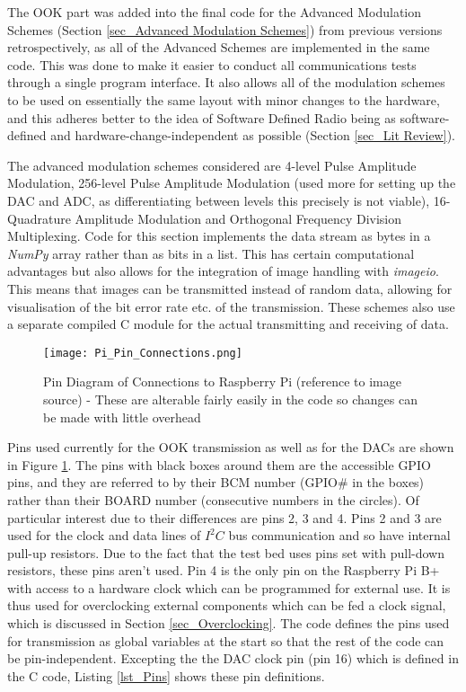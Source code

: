 \documentclass[../main.tex]{subfiles}
\begin{document}
The OOK part was added into the final code for the Advanced Modulation Schemes (Section \ref{sec_Advanced Modulation Schemes})  from previous versions retrospectively, as all of the Advanced Schemes are implemented in the same code.
This was done to make it easier to conduct all communications tests through a single program interface.
It also allows all of the modulation schemes to be used on essentially the same layout with minor changes to the hardware, and this adheres better to the idea of Software Defined Radio being as software-defined and hardware-change-independent as possible (Section \ref{sec_Lit Review}).\\

The advanced modulation schemes considered are 4-level Pulse Amplitude Modulation, 256-level Pulse Amplitude Modulation (used more for setting up the DAC and ADC, as differentiating between levels this precisely is not viable), 16-Quadrature Amplitude Modulation and Orthogonal Frequency Division Multiplexing.
Code for this section implements the data stream as bytes in a \textit{NumPy} array rather than as bits in a list.
This has certain computational advantages but also allows for the integration of image handling with \textit{imageio}.
This means that images can be transmitted instead of random data, allowing for visualisation of the bit error rate etc. of the transmission.
These schemes also use a separate compiled C module for the actual transmitting and receiving of data.\\

\begin{figure}[ht]
	\centering
	\texttt{[image: Pi\_Pin\_Connections.png]}
	\caption{Pin Diagram of Connections to Raspberry Pi (reference to image source) - These are alterable fairly easily in the code so changes can be made with little overhead}
	\label{fig_Pin Connections}
\end{figure}

Pins used currently for the OOK transmission as well as for the DACs are shown in Figure \ref{fig_Pin Connections}.
The pins with black boxes around them are the accessible GPIO pins, and they are referred to by their BCM number (GPIO\# in the boxes) rather than their BOARD number (consecutive numbers in the circles).
Of particular interest due to their differences are pins 2, 3 and 4.
Pins 2 and 3 are used for the clock and data lines of $I^2C$ bus communication and so have internal pull-up resistors.
Due to the fact that the test bed uses pins set with pull-down resistors, these pins aren't used.
Pin 4 is the only pin on the Raspberry Pi B+ with access to a hardware clock which can be programmed for external use.
It is thus used for overclocking external components which can be fed a clock signal, which is discussed in Section \ref{sec_Overclocking}.
The code defines the pins used for transmission as global variables at the start so that the rest of the code can be pin-independent.
Excepting the the DAC clock pin (pin 16) which is defined in the C code, Listing \ref{lst_Pins} shows these pin definitions.\\
\end{document}
